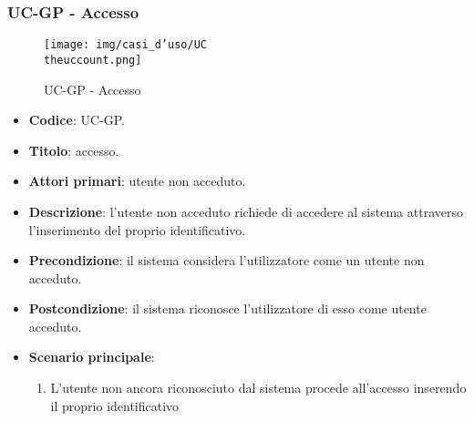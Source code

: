 \subsubsection{UC\theuccount-GP - Accesso}
		\begin{figure}[H]
			\centering
				\texttt{[image: img/casi\_d'uso/UC\\theuccount.png]}\\
			\caption{UC\theuccount-GP - Accesso}
		\end{figure}
	\begin{itemize}
		\item \textbf{Codice}: UC\theuccount-GP.
		\item \textbf{Titolo}: accesso.
		\item \textbf{Attori primari}: utente non acceduto.
		\item \textbf{Descrizione}: l'utente non acceduto richiede di accedere al sistema attraverso l'inserimento del proprio identificativo.
		\item \textbf{Precondizione}: il sistema considera l’utilizzatore come un utente non acceduto.
		\item \textbf{Postcondizione}: il sistema riconosce l'utilizzatore di esso come utente acceduto.
		\item \textbf{Scenario principale}:
		\begin{enumerate}
			\item L'utente non ancora riconosciuto dal sistema procede all'accesso inserendo il proprio identificativo
		\end{enumerate}
	\end{itemize}


